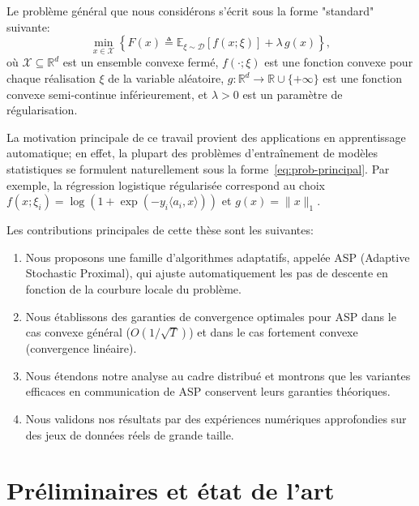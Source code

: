 \documentclass[12pt,a4paper]{report}
\begin{document}
Le probl\`eme g\'en\'eral que nous consid\'erons s'\'ecrit sous la forme
"standard" suivante:
\begin{equation}\label{eq:prob-principal}
  \min_{x \in \mathcal{X}} \left\{ F(x) \triangleq
    \mathbb{E}_{\xi \sim \mathcal{D}} \left[ f(x; \xi) \right]
    + \lambda \, g(x) \right\},
\end{equation}
o\`u $\mathcal{X} \subseteq \mathbb{R}^d$ est un ensemble convexe ferm\'e,
$f(\cdot; \xi)$ est une fonction convexe pour chaque r\'ealisation $\xi$
de la variable al\'eatoire, $g : \mathbb{R}^d \to \mathbb{R} \cup \{+\infty\}$
est une fonction convexe semi-continue inf\'erieurement, et $\lambda > 0$
est un param\`etre de r\'egularisation.

La motivation principale de ce travail provient des applications en
apprentissage automatique; en effet, la plupart des probl\`emes
d'entra\^inement de mod\`eles statistiques se formulent naturellement
sous la forme~\eqref{eq:prob-principal}. Par exemple, la r\'egression
logistique r\'egularis\'ee correspond au choix $f(x; \xi_i) =
\log(1 + \exp(-y_i \langle a_i, x \rangle))$ et $g(x) = \|x\|_1$.

Les contributions principales de cette th\`ese sont les suivantes:
\begin{enumerate}
  \item Nous proposons une famille d'algorithmes adaptatifs, appel\'ee
    ASP (Adaptive Stochastic Proximal), qui ajuste automatiquement les
    pas de descente en fonction de la courbure locale du probl\`eme.
  \item Nous \'etablissons des garanties de convergence optimales pour
    ASP dans le cas convexe g\'en\'eral ($O(1/\sqrt{T})$) et dans le
    cas fortement convexe (convergence lin\'eaire).
  \item Nous \'etendons notre analyse au cadre distribu\'e et montrons
    que les variantes efficaces en communication de ASP conservent leurs
    garanties th\'eoriques.
  \item Nous validons nos r\'esultats par des exp\'eriences num\'eriques
    approfondies sur des jeux de donn\'ees r\'eels de grande taille.
\end{enumerate}


\chapter{Pr\'eliminaires et \'etat de l'art}
\end{document}
